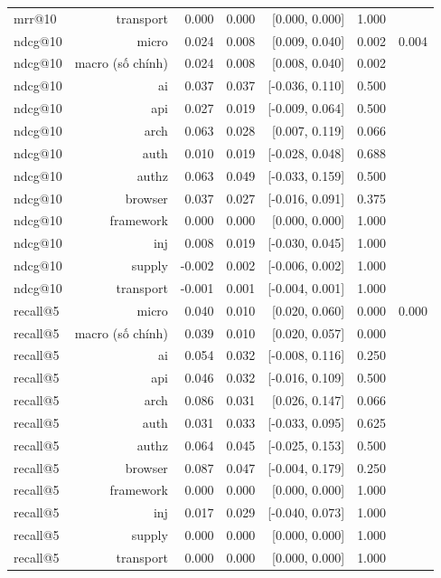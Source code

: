 \begin{table}[ht]
\begin{tabular}{lrrrrrr}
mrr@10 & transport & 0.000 & 0.000 & [0.000, 0.000] & 1.000 &  \\
ndcg@10 & micro & 0.024 & 0.008 & [0.009, 0.040] & 0.002 & 0.004 \\
ndcg@10 & macro (số chính) & 0.024 & 0.008 & [0.008, 0.040] & 0.002 &  \\
ndcg@10 & ai & 0.037 & 0.037 & [-0.036, 0.110] & 0.500 &  \\
ndcg@10 & api & 0.027 & 0.019 & [-0.009, 0.064] & 0.500 &  \\
ndcg@10 & arch & 0.063 & 0.028 & [0.007, 0.119] & 0.066 &  \\
ndcg@10 & auth & 0.010 & 0.019 & [-0.028, 0.048] & 0.688 &  \\
ndcg@10 & authz & 0.063 & 0.049 & [-0.033, 0.159] & 0.500 &  \\
ndcg@10 & browser & 0.037 & 0.027 & [-0.016, 0.091] & 0.375 &  \\
ndcg@10 & framework & 0.000 & 0.000 & [0.000, 0.000] & 1.000 &  \\
ndcg@10 & inj & 0.008 & 0.019 & [-0.030, 0.045] & 1.000 &  \\
ndcg@10 & supply & -0.002 & 0.002 & [-0.006, 0.002] & 1.000 &  \\
ndcg@10 & transport & -0.001 & 0.001 & [-0.004, 0.001] & 1.000 &  \\
recall@5 & micro & 0.040 & 0.010 & [0.020, 0.060] & 0.000 & 0.000 \\
recall@5 & macro (số chính) & 0.039 & 0.010 & [0.020, 0.057] & 0.000 &  \\
recall@5 & ai & 0.054 & 0.032 & [-0.008, 0.116] & 0.250 &  \\
recall@5 & api & 0.046 & 0.032 & [-0.016, 0.109] & 0.500 &  \\
recall@5 & arch & 0.086 & 0.031 & [0.026, 0.147] & 0.066 &  \\
recall@5 & auth & 0.031 & 0.033 & [-0.033, 0.095] & 0.625 &  \\
recall@5 & authz & 0.064 & 0.045 & [-0.025, 0.153] & 0.500 &  \\
recall@5 & browser & 0.087 & 0.047 & [-0.004, 0.179] & 0.250 &  \\
recall@5 & framework & 0.000 & 0.000 & [0.000, 0.000] & 1.000 &  \\
recall@5 & inj & 0.017 & 0.029 & [-0.040, 0.073] & 1.000 &  \\
recall@5 & supply & 0.000 & 0.000 & [0.000, 0.000] & 1.000 &  \\
recall@5 & transport & 0.000 & 0.000 & [0.000, 0.000] & 1.000 &  \\

\end{tabular}
\end{table}
